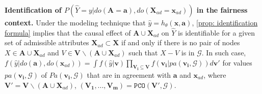 \documentclass{article} %
\begin{document}
\textbf{Identification of $P(\hat{Y}=y|do(\mathbf{A}=\mathbf{a}), do(\mathbf{X}_{ad}=\mathbf{x}_{ad}))$ in the fairness context.}
Under the modeling technique that $\hat{y}=h_{\theta}(\mathbf{x}, \mathbf{a})$, \cref{prop: identification formula} implies that the causal effect of $\mathbf{A} \cup \mathbf{X}_{ad}$ on $\hat{Y}$ is identifiable for a given set of admissible attributes $\mathbf{X}_{ad} \subset \mathbf{X}$ if and only if there is no pair of nodes $X \in \mathbf{A} \cup \mathbf{X}_{ad}$ and $V \in \mathbf{V} \backslash (\mathbf{A} \cup \mathbf{X}_{ad})$ such that $X - V$ is in $\mathcal{G}$. In such case, $f(\hat{y}|do(\mathbf{a}), do(\mathbf{x}_{ad})) = \int f(\hat{y}|\mathbf{v}) \prod_{\mathbf{V_i} \subseteq \mathbf{V}} f(\mathbf{v_i}|pa(\mathbf{v_i}, \mathcal{G})) d \mathbf{v'}$
for values $pa(\mathbf{v_i}, \mathcal{G})$ of $Pa(\mathbf{v_i}, \mathcal{G})$ that are in agreement with $\mathbf{a}$ and $\mathbf{x}_{ad}$, where $\mathbf{V'}= \mathbf{V} \backslash (\mathbf{A} \cup {\mathbf{X}_{ad}})$, $(\mathbf{V_1,...,V_m})=\texttt{PCO}(\mathbf{V'}, \mathcal{G})$.
\end{document}
